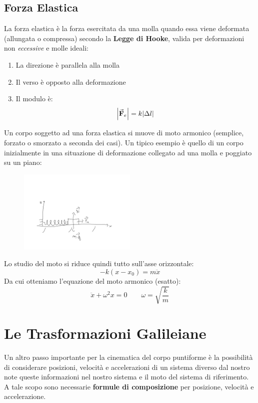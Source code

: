 \documentclass{report}
\newcommand{\F}{\va{F}}
\begin{document}
\subsection{Forza Elastica}
La forza elastica è la forza esercitata da una molla quando essa viene deformata (allungata o compressa) secondo la \textbf{Legge di Hooke}, valida per deformazioni non \textit{eccessive} e molle ideali:
\begin{enumerate}
    \item La direzione è parallela alla molla
    \item Il verso è opposto alla deformazione
    \item Il modulo è:
    \[\abs{\F_e}=k\abs{\Delta l}\]
\end{enumerate}
Un corpo soggetto ad una forza elastica si muove di moto armonico (semplice, forzato o smorzato a seconda dei casi). Un tipico esempio è quello di un corpo inizialmente in una situazione di deformazione collegato ad una molla e poggiato su un piano:
\begin{figure}[H]
    \centering
    \includegraphics[width=0.5\textwidth]{ForzaElastica.png}
\end{figure}
Lo studio del moto si riduce quindi tutto sull'asse orizzontale:
\[-k(x-x_0)=m\ddot{x}\]
Da cui otteniamo l'equazione del moto armonico (esatto):
\[\ddot{x}+\omega^2x=0\quad\quad\omega=\sqrt{\frac{k}{m}}\]



\section{Le Trasformazioni Galileiane}
Un altro passo importante per la cinematica del corpo puntiforme è la possibilità di considerare posizioni, velocità e accelerazioni di un sistema diverso dal nostro note queste informazioni nel nostro sistema e il moto del sistema di riferimento.\\
A tale scopo sono necessarie \textbf{formule di composizione} per posizione, velocità e accelerazione. 
\end{document}
